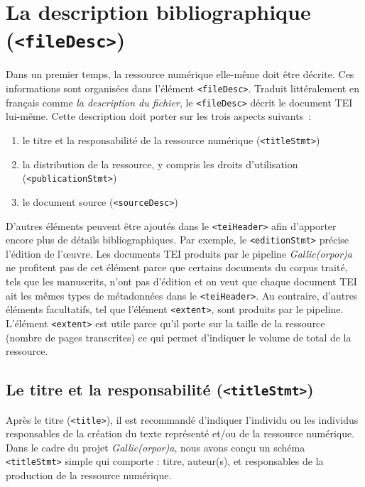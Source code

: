 \documentclass[class=article, crop=false]{standalone}
\begin{document}
\section{La description bibliographique (\texttt{<fileDesc>})}
Dans un premier temps, la ressource numérique elle-même doit être décrite. Ces informations sont organisées dans l'élément \texttt{<fileDesc>}. Traduit littéralement en français comme \textit{la description du fichier}, le \texttt{<fileDesc>} décrit le document \acrshort{TEI} lui-même. Cette description doit porter sur les trois aspects suivants~:
\begin{enumerate}
\item le titre et la responsabilité de la ressource numérique (\texttt{<titleStmt>})
\item la distribution de la ressource, y compris les droits d'utilisation (\texttt{<publicationStmt>})
\item le document source (\texttt{<sourceDesc>})
\end{enumerate}
D'autres éléments peuvent être ajoutés dans le \texttt{<teiHeader>} afin d'apporter encore plus de détails bibliographiques. Par exemple, le \texttt{<editionStmt>} précise l'édition de l'œuvre. Les documents \acrshort{TEI} produits par le pipeline \textit{Gallic(orpor)a} ne profitent pas de cet élément parce que certains documents du corpus traité, tels que les manuscrits, n'ont pas d'édition et on veut que chaque document \acrshort{TEI} ait les mêmes types de métadonnées dans le \texttt{<teiHeader>}. Au contraire, d'autres éléments facultatifs, tel que l'élément \texttt{<extent>}, sont produits par le pipeline. L'élément \texttt{<extent>} est utile parce qu'il porte sur la taille de la ressource (nombre de pages transcrites) ce qui permet d'indiquer le volume de total de la ressource.

\subsection{Le titre et la responsabilité (\texttt{<titleStmt>})}
Après le titre (\texttt{<title>}), il est recommandé d'indiquer l'individu ou les individus responsables de la création du texte représenté et/ou de la ressource numérique. Dans le cadre du projet \textit{Gallic(orpor)a}, nous avons conçu un schéma \texttt{<titleStmt>} simple qui comporte : titre, auteur(s), et responsables de la production de la ressource numérique.
\end{document}
